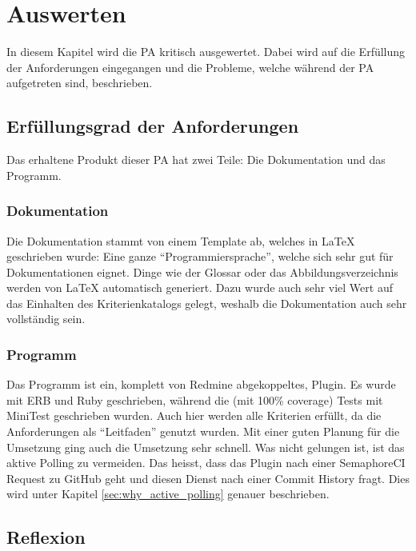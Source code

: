 \chapter{Auswerten}
In diesem Kapitel wird die PA kritisch ausgewertet. Dabei wird auf die Erfüllung der Anforderungen eingegangen
und die Probleme, welche während der PA aufgetreten sind, beschrieben.
\section{Erfüllungsgrad der Anforderungen}
Das erhaltene Produkt dieser PA hat zwei Teile: Die Dokumentation und das Programm.
\subsection{Dokumentation}
Die Dokumentation stammt von einem Template \cite{Buhler_ipa-template_2022} ab, welches in LaTeX geschrieben
wurde: Eine ganze \enquote{Programmiersprache}, welche sich sehr gut für Dokumentationen eignet. Dinge wie der
Glossar oder das Abbildungsverzeichnis werden von LaTeX automatisch generiert. \newline
Dazu wurde auch sehr viel Wert auf das Einhalten des Kriterienkatalogs gelegt, weshalb die Dokumentation auch
sehr vollständig sein.
\subsection{Programm}
Das Programm ist ein, komplett von Redmine abgekoppeltes, Plugin. Es wurde mit ERB und Ruby geschrieben, während
die (mit 100\% coverage) Tests mit MiniTest geschrieben wurden. Auch hier werden alle Kriterien erfüllt, da die
Anforderungen als \enquote{Leitfaden} genutzt wurden. Mit einer guten Planung für die Umsetzung ging auch die
Umsetzung sehr schnell. \newline
Was nicht gelungen ist, ist das aktive Polling zu vermeiden. Das heisst, dass das Plugin nach einer SemaphoreCI
Request zu GitHub geht und diesen Dienst nach einer Commit History fragt. Dies wird unter Kapitel
\ref{sec:why_active_polling} genauer beschrieben.
\section{Reflexion}

